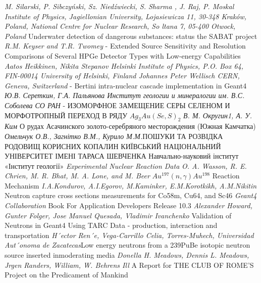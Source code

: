 \documentclass[a4paper, 14pt]{article}
\numberwithin{equation}{section}
\numberwithin{table}{section}
\begin{document}
\begin{thebibliography}{}
	
	\textit{M. Silarski, P. Sibczyński, Sz. Niedźwiecki, S. Sharma , J. Raj, P. Moskal Institute of Physics, Jagiellonian University, Lojasiewicza 11, 30-348 Kraków, Poland, National Centre for Nuclear Research, So ltana 7, 05-400 Otwock, Poland } Underwater detection of dangerous substances: status the
	SABAT project \label{lit:sabat}
	 \textit{R.M. Keyser and T.R. Twomey} - Extended Source Sensitivity and Resolution Comparisons of Several HPGe Detector Types with Low-energy Capabilities 
	 \textit{Aatos Heikkinen, Nikita Stepanov Helsinki Institute of Physics, P.O. Box 64, FIN-00014 University of Helsinki, Finland Johannes Peter Wellisch CERN, Geneva, Switzerland} - Bertini intra-nuclear cascade implementation in Geant4 
	 \textit{Ю.В. Сереткин, Г.А. Пальянова Институт геологии и минералогии им. В.С. Соболева СО РАН} - ИЗОМОРФНОЕ ЗАМЕЩЕНИЕ СЕРЫ СЕЛЕНОМ И МОРФОТРОПНЫЙ ПЕРЕХОД В РЯДУ $Ag_3Au(Se,S)_2$ 	
	 \textit{В. М. Округин1, А. У. Ким} О рудах Асачинского золото-серебряного месторождения
	(Южная Камчатка)
	 \textit{Омельчук О.В., Загнітко В.М., Курило М.М.}ПОШУКИ ТА РОЗВІДКА РОДОВИЩ КОРИСНИХ КОПАЛИН КИЇВСЬКИЙ НАЦІОНАЛЬНИЙ УНІВЕРСИТЕТ ІМЕНІ ТАРАСА ШЕВЧЕНКА Навчально-науковий інститут «Інститут геології»
	 \textit{Experimental Nuclear Reaction Data}
	 \textit{O. A. Wasson, R. E. Chrien, M. R. Bhat, M. A. Lone, and M. Beer} $Au^{197}(n, \gamma)Au^{198}$ Reaction Mechanism 
	 \textit{	I.A.Kondurov, A.I.Egorov, M.Kaminker, E.M.Korotkikh, A.M.Nikitin}  Neutron capture cross sections measurements for Co58m, Cu64, and Sc46
	 \textit{ Geant4 Collaboration } Book For Application Developers
	Release 10.3
	 \textit{ Alexander Howard, Gunter Folger, Jose Manuel Quesada, Vladimir Ivanchenko} Validation of Neutrons in Geant4 Using TARC Data - production, interaction and transportation \label{lit:tarc}
	 \textit{H´ector Ren´e, Vega-Carrillo Celia, Torres-Muhech, Universidad Aut´onoma de Zacatecas}Low energy neutrons from a 239PuBe isotopic neutron source inserted inmoderating media
	 \textit{Donella H. Meadows,	Dennis L. Meadows, Jrgen Randers, William, W. Behrens Ill } A Report for THE CLUB OF ROME'S Project on the
	Predicament of Mankind  \label{lit:romeClub}
	
\end{thebibliography}
	
\end{document}
